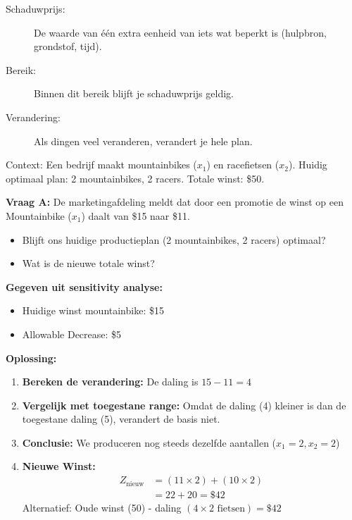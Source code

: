 \documentclass[a4paper,11pt]{article}
\begin{document}
\begin{description}
    \item[Schaduwprijs:] 
    De waarde van één extra eenheid van iets wat beperkt is (hulpbron, grondstof, tijd).
    \item[Bereik:] 
    Binnen dit bereik blijft je schaduwprijs geldig.
    \item[Verandering:] 
    Als dingen veel veranderen, verandert je hele plan.
\end{description}


\begin{oefenblok}[title=Oefening 1: Verandering in Winstmarges]
    Context: Een bedrijf maakt mountainbikes ($x_1$) en racefietsen ($x_2$). 
    Huidig optimaal plan: 2 mountainbikes, 2 racers. Totale winst: \$50.
    
    \textbf{Vraag A:} De marketingafdeling meldt dat door een promotie de winst op een Mountainbike ($x_1$) daalt van \$15 naar \$11.
    \begin{itemize}
        \item Blijft ons huidige productieplan (2 mountainbikes, 2 racers) optimaal?
        \item Wat is de nieuwe totale winst?
    \end{itemize}
    
    \textbf{Gegeven uit sensitivity analyse:}
    \begin{itemize}
        \item Huidige winst mountainbike: \$15
        \item Allowable Decrease: \$5
    \end{itemize}
    
    \textbf{Oplossing:}
    \begin{enumerate}
        \item \textbf{Bereken de verandering:} De daling is $15 - 11 = 4$
        \item \textbf{Vergelijk met toegestane range:} 
        Omdat de daling (4) kleiner is dan de toegestane daling (5), verandert de basis niet.
        \item \textbf{Conclusie:} We produceren nog steeds dezelfde aantallen ($x_1 = 2, x_2 = 2$)
        \item \textbf{Nieuwe Winst:} 
        \begin{align*}
            Z_{\text{nieuw}} &= (11 \times 2) + (10 \times 2) \\
            &= 22 + 20 = \$42
        \end{align*}
        Alternatief: Oude winst (50) - daling $(4 \times 2 \text{ fietsen}) = \$42$
    \end{enumerate}
    

\end{oefenblok}
\end{document}
